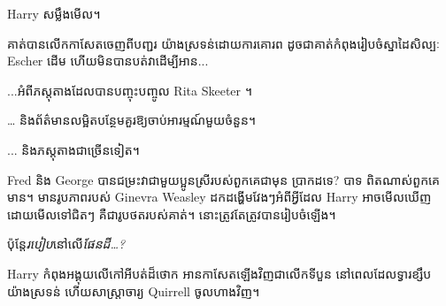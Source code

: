Harry សម្លឹងមើល។

គាត់​បាន​លើក​កាសែត​ចេញ​ពី​បញ្ជរ យ៉ាង​ស្រទន់​ដោយ​ការគោរព ដូចជា​គាត់​កំពុង​រៀបចំ​ស្នាដៃ​សិល្បៈ Escher ដើម ហើយ​មិន​បាន​បត់​វា​ដើម្បី​អាន...

...អំពីភស្តុតាងដែលបានបញ្ចុះបញ្ចូល Rita Skeeter ។

… និងព័ត៌មានលម្អិតបន្ថែមគួរឱ្យចាប់អារម្មណ៍មួយចំនួន។

... និងភស្តុតាងជាច្រើនទៀត។

Fred និង George បានជម្រះវាជាមួយប្អូនស្រីរបស់ពួកគេជាមុន ប្រាកដទេ? បាទ ពិតណាស់ពួកគេមាន។ មានរូបភាពរបស់ Ginevra Weasley ដកដង្ហើមវែងៗអំពីអ្វីដែល Harry អាចមើលឃើញ ដោយមើលទៅជិតៗ គឺជារូបថតរបស់គាត់។ នោះត្រូវតែត្រូវបានរៀបចំឡើង។

ប៉ុន្តែ\emph{របៀប}នៅលើ\emph{ផែនដី…?}

Harry កំពុងអង្គុយលើកៅអីបត់ដ៏ថោក អានកាសែតឡើងវិញជាលើកទីបួន នៅពេលដែលទ្វារខ្សឹបយ៉ាងស្រទន់ ហើយសាស្រ្តាចារ្យ Quirrell ចូលហាងវិញ។

